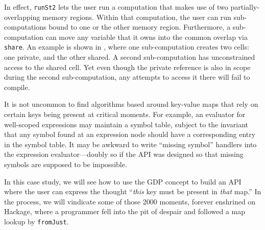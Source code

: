 \documentclass[format=sigplan, review=false, screen=true, 10pt]{acmart}
\makeatletter
\let\origsection\section
\renewcommand\section{\@ifstar{\starsection}{\nostarsection}}
\newcommand\nostarsection[1]
{\sectionprelude\origsection{#1}\sectionpostlude}
\newcommand\starsection[1]
{\sectionprelude\origsection*{#1}\sectionpostlude}
\newcommand\sectionprelude{%
  \vspace{-0.5em}
}
\newcommand\sectionpostlude{%
  \vspace{0em}
}
\makeatother
\begin{document}
In effect, \texttt{runSt2} lets the user run a computation that makes use of
two partially-overlapping memory regions. Within that computation, the user
can run sub-computations bound to one or the other memory region. Furthermore,
a sub-computation can move any variable that it owns into the common overlap
via \texttt{share}. An example is shown in , where one sub-computation
creates two cells: one private, and the other shared. A second sub-computation has unconstrained
access to the shared cell. Yet even though the private reference is also in scope during
the second sub-computation, any attempts to access it there will fail to compile.

\section{Case Study \#3: Key-value lookups}

It is not uncommon to find algorithms based around key-value maps that rely
on certain keys being present at critical moments. For example, an evaluator for
well-scoped expressions may maintain a symbol table, subject to the
invariant that any symbol found at an expression node should have a corresponding entry in the
symbol table. It may be awkward to write ``missing symbol'' handlers into the expression
evaluator---doubly so if the API was designed so that missing symbols are supposed to
be impossible.

In this case study, we will see how to use the GDP concept to build an API where the
user can express the thought ``\emph{this} key must be present in \emph{that} map.''
In the process, we will vindicate  some of those
2000 moments, forever enshrined on Hackage, where a programmer fell into
the pit of despair and followed a map lookup by \texttt{fromJust}.
\end{document}

